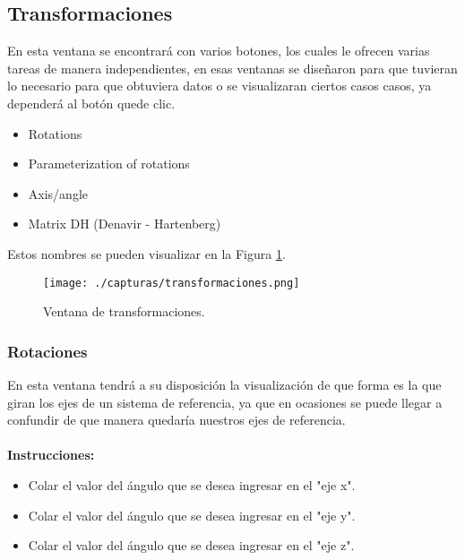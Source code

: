 \documentclass[12pt]{article}
\begin{document}
\subsection{Transformaciones}
En esta ventana se encontrará con varios botones, los cuales le ofrecen varias tareas de manera independientes, en esas ventanas se diseñaron para que tuvieran lo necesario para que obtuviera datos o se visualizaran ciertos casos casos, ya dependerá al botón quede clic.\\
\begin{itemize}
	\item Rotations
	\item Parameterization of rotations
	\item Axis/angle
	\item Matrix DH (Denavir - Hartenberg)
\end{itemize}
Estos nombres se pueden visualizar en la Figura \ref{fig:2}.
\begin{figure}[htb]
	\centering
	\texttt{[image: ./capturas/transformaciones.png]}
	\caption{Ventana de transformaciones.} \label{fig:2}
\end{figure}
\subsubsection{Rotaciones}
En esta ventana tendrá a su disposición la visualización de que forma es la que giran los ejes de un sistema de referencia, ya que en ocasiones se puede llegar a confundir de que manera quedaría nuestros ejes de referencia.\\
\\
{\large \textbf{Instrucciones:} }
\begin{itemize}
	\item Colar el valor del ángulo que se desea ingresar en el "eje x".
	\item Colar el valor del ángulo que se desea ingresar en el "eje y".
	\item Colar el valor del ángulo que se desea ingresar en el "eje z".
\end{itemize}
\end{document}
